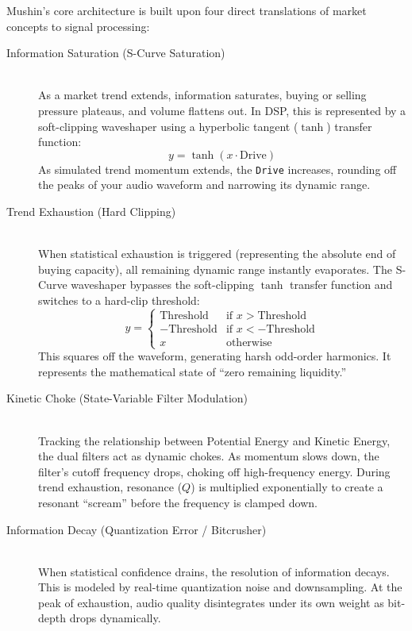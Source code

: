 \documentclass[11pt,a4paper,oneside]{book}
\begin{document}
Mushin's core architecture is built upon four direct translations of market concepts to signal processing:

\begin{description}
    \item[Information Saturation (S-Curve Saturation)] \hfill \\
    As a market trend extends, information saturates, buying or selling pressure plateaus, and volume flattens out. In DSP, this is represented by a soft-clipping waveshaper using a hyperbolic tangent ($\tanh$) transfer function:
    \begin{equation*}
        y = \tanh(x \cdot \text{Drive})
    \end{equation*}
    As simulated trend momentum extends, the \texttt{Drive} increases, rounding off the peaks of your audio waveform and narrowing its dynamic range.
    
    \item[Trend Exhaustion (Hard Clipping)] \hfill \\
    When statistical exhaustion is triggered (representing the absolute end of buying capacity), all remaining dynamic range instantly evaporates. The S-Curve waveshaper bypasses the soft-clipping $\tanh$ transfer function and switches to a hard-clip threshold:
    \begin{equation*}
        y = \begin{cases} 
            \text{Threshold} & \text{if } x > \text{Threshold} \\
            -\text{Threshold} & \text{if } x < -\text{Threshold} \\
            x & \text{otherwise}
        \end{cases}
    \end{equation*}
    This squares off the waveform, generating harsh odd-order harmonics. It represents the mathematical state of ``zero remaining liquidity.''
    
    \item[Kinetic Choke (State-Variable Filter Modulation)] \hfill \\
    Tracking the relationship between Potential Energy and Kinetic Energy, the dual filters act as dynamic chokes. As momentum slows down, the filter's cutoff frequency drops, choking off high-frequency energy. During trend exhaustion, resonance ($Q$) is multiplied exponentially to create a resonant ``scream'' before the frequency is clamped down.
    
    \item[Information Decay (Quantization Error / Bitcrusher)] \hfill \\
    When statistical confidence drains, the resolution of information decays. This is modeled by real-time quantization noise and downsampling. At the peak of exhaustion, audio quality disintegrates under its own weight as bit-depth drops dynamically.
\end{description}
\end{document}
